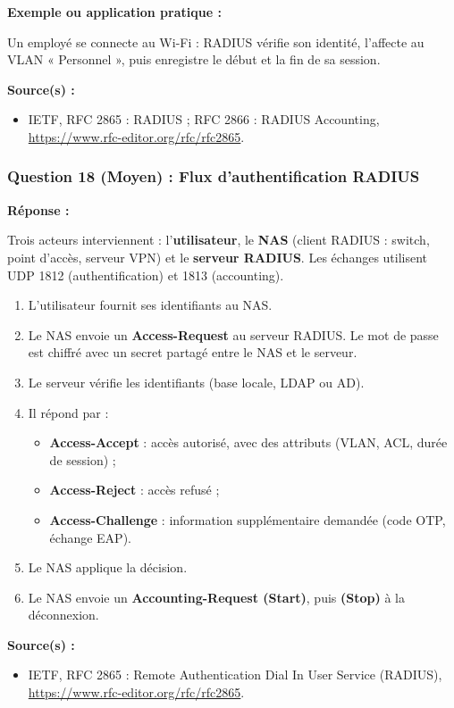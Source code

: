 \documentclass[12pt,a4paper]{article}
\newcommand{\reponse}{\textbf{Réponse :}\par}
\newcommand{\exemple}{\textbf{Exemple ou application pratique :}\par}
\newcommand{\sources}{\textbf{Source(s) :}}
\begin{document}
\exemple
Un employé se connecte au Wi-Fi : RADIUS vérifie son identité,
l'affecte au VLAN « Personnel », puis enregistre le début et la fin de
sa session.

\sources
\begin{itemize}
    \item IETF, RFC 2865 : RADIUS ; RFC 2866 : RADIUS Accounting,
    \url{https://www.rfc-editor.org/rfc/rfc2865}.
\end{itemize}

\subsubsection*{Question 18 (Moyen) : Flux d'authentification RADIUS}

\reponse
Trois acteurs interviennent : l'\textbf{utilisateur}, le \textbf{NAS}
(client RADIUS : switch, point d'accès, serveur VPN) et le
\textbf{serveur RADIUS}. Les échanges utilisent UDP 1812
(authentification) et 1813 (accounting).

\begin{enumerate}
    \item L'utilisateur fournit ses identifiants au NAS.
    \item Le NAS envoie un \textbf{Access-Request} au serveur RADIUS. Le
    mot de passe est chiffré avec un secret partagé entre le NAS et le
    serveur.
    \item Le serveur vérifie les identifiants (base locale, LDAP ou AD).
    \item Il répond par :
    \begin{itemize}
        \item \textbf{Access-Accept} : accès autorisé, avec des
        attributs (VLAN, ACL, durée de session) ;
        \item \textbf{Access-Reject} : accès refusé ;
        \item \textbf{Access-Challenge} : information supplémentaire
        demandée (code OTP, échange EAP).
    \end{itemize}
    \item Le NAS applique la décision.
    \item Le NAS envoie un \textbf{Accounting-Request (Start)}, puis
    \textbf{(Stop)} à la déconnexion.
\end{enumerate}

\sources
\begin{itemize}
    \item IETF, RFC 2865 : Remote Authentication Dial In User Service
    (RADIUS), \url{https://www.rfc-editor.org/rfc/rfc2865}.
\end{itemize}
\end{document}

